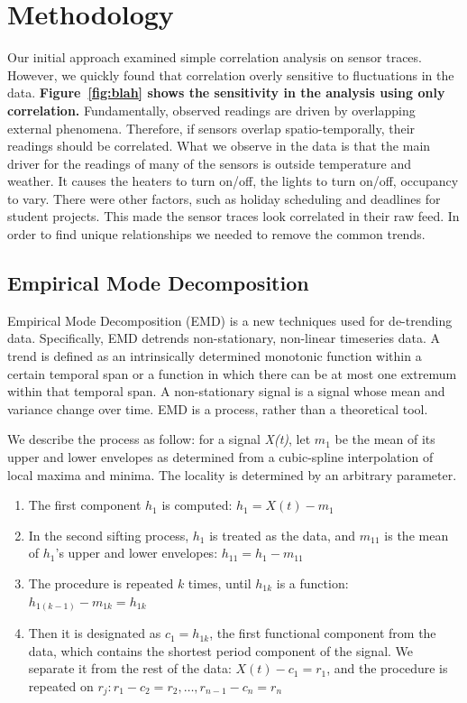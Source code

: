 \section{Methodology}\label{method}

Our initial approach examined simple correlation analysis on sensor traces.  However, we quickly
found that correlation overly sensitive to fluctuations in the data.  {\bf Figure~\ref{fig:blah} shows
the sensitivity in the analysis using only correlation.}
Fundamentally, observed readings are driven by overlapping external phenomena.  Therefore,
if  sensors overlap spatio-temporally, their readings should be correlated.  What we observe in the data
is that the main driver for the readings of many of the sensors is outside temperature and weather.  It causes 
the heaters to turn on/off, the lights to turn on/off, occupancy to vary.  There were other factors, such as 
holiday scheduling and deadlines for student projects.  This made the sensor traces look correlated in
their raw feed.  In order to find unique relationships we needed to remove the common trends.

\subsection{Empirical Mode Decomposition}
Empirical Mode Decomposition (EMD) \cite{huang:emd1998} is a new techniques used for de-trending data.
Specifically, EMD detrends non-stationary, non-linear timeseries data.  A trend is defined as 
an intrinsically determined monotonic function within a certain temporal span or a function in which there 
can be at most one extremum within that temporal span.  A non-stationary signal is a signal whose mean and
variance change over time.  EMD is a process, rather than a theoretical tool.

We describe the process as follow:  for a signal \emph{X(t)}, let $m_1$ be the mean of its upper and
lower envelopes as determined from a cubic-spline interpolation of local maxima and minima. The locality 
is determined by an arbitrary parameter.

\begin{enumerate}
\item The first component $h_1$ is computed: $h_1=X(t)-m_1$
\item In the second sifting process, $h_1$ is treated as the data, and $m_{11}$ is the mean of $h_1$'s upper and lower envelopes: $h_{11}=h_1-m_{11}$
\item The procedure is repeated $k$ times, until $h_{1k}$ is a function: $h_{1(k-1)}-m_{1k}=h_{1k}$
\item Then it is designated as $c_1=h_{1k}$, the first functional component from the data, which contains the shortest period component of the signal. We separate it from the rest of the data: $X(t)-c_1 = r_1$, and the procedure is
repeated on $r_j: r_1-c_2 = r_2,\dots,r_{n-1} - c_n = r_n$
\end{enumerate}

